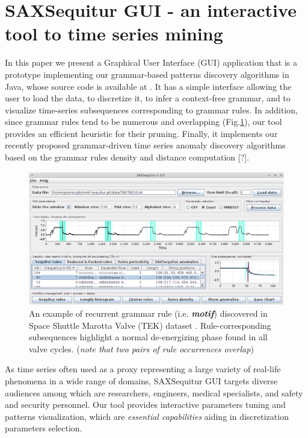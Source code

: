 \documentclass{llncs}
\begin{document}
\section{SAXSequitur GUI - an interactive tool to time series mining}
In this paper we present a Graphical User Interface (GUI) application that is a prototype implementing our grammar-based patterns discovery algorithms in Java, whose source code is available at \cite{jmotif}. It has a simple interface allowing the user to load the data, to discretize it, to infer a context-free grammar, and to visualize time-series subsequences corresponding to grammar rules. In addition, since grammar rules tend to be numerous and overlapping (Fig.\ref{fig1}), our tool provides an efficient heuristic for their pruning. Finally, it implements our recently proposed grammar-driven time series anomaly discovery algorithms based on the grammar rules density and distance computation [?].

\begin{figure}[t]
   \vspace{-0.8cm}
   \centering
   \includegraphics[width=120mm]{Figure1_TEK16_R95.eps}
   \caption{An example of recurrent grammar rule (i.e. \textbf{\textit{motif}}) discovered in Space Shuttle Marotta Valve (TEK) dataset \cite{hot_sax}. Rule-corresponding subsequences highlight a normal de-energizing phase found in all valve cycles. (\textit{note that two pairs of rule occurrences overlap})}
   \label{fig1}
   \vspace{-0.4cm}
\end{figure}

As time series often used as a proxy representing a large variety of real-life phenomena in a wide range of domains, SAXSequitur GUI targets diverse audiences among which are researchers, engineers, medical specialists, and safety and security personnel. Our tool provides interactive parameters tuning and patterns visualization, which are \textit{essential capabilities} aiding in discretization parameters selection.
\end{document}

